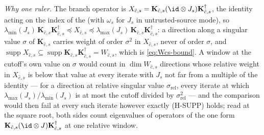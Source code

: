 \begin{remark}
\emph{Why one ruler.} The branch operator is
$X_{\hat c,s}=\mathbf K_{\hat c,s}(\id\otimes J_s)
\mathbf K_{\hat c,s}^{\dagger}$, the identity acting on the index of the
 (with $\omega_s$ for $J_s$ in
untrusted-source mode), so
$\lambda_{\min}(J_s)\,\mathbf K_{\hat c,s}\mathbf K_{\hat c,s}^{\dagger}
\preceq X_{\hat c,s}\preceq
\lambda_{\max}(J_s)\,\mathbf K_{\hat c,s}\mathbf K_{\hat c,s}^{\dagger}$:
a direction along a singular value $\sigma$ of $\mathbf K_{\hat c,s}$
carries weight of order $\sigma^2$ in $X_{\hat c,s}$, never of order
$\sigma$, and $\operatorname{supp}X_{\hat c,s}\subseteq
\operatorname{supp}\mathbf K_{\hat c,s}\mathbf K_{\hat c,s}^{\dagger}
=W_{\hat c,s}$, which is \eqref{eq:Wcs-bound}. A window at the cutoff's
own value on $\sigma$ would count in $\dim W_{\hat c,s}$ directions whose
relative weight in $X_{\hat c,s}$ is below that value at every iterate with
$J_s$ not far from a multiple of the identity --- for a direction at
relative singular value $\sigma_{\mathrm{rel}}$, every iterate at which
$\lambda_{\max}(J_s)/\lambda_{\min}(J_s)$ is at most the cutoff divided by
$\sigma_{\mathrm{rel}}^2$ --- and the comparison would then fail at every
such iterate however exactly (H-SUPP) holds; read at the square root, both
sides count eigenvalues of operators of the one form
$\mathbf K_{\hat c,s}(\id\otimes J)\mathbf K_{\hat c,s}^{\dagger}$ at one
relative window.
\end{remark}
